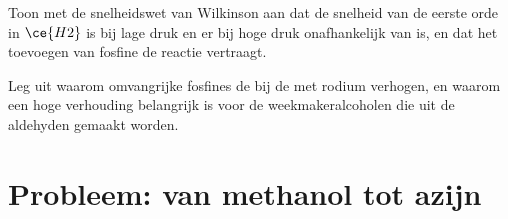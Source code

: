 \begin{exercise}[$\star\star\star$]\label{exo:b3:homogeneous-catalysis:11}
Toon met de snelheidswet van Wilkinson aan dat de snelheid van de eerste orde in $\ce{H2}$ is bij lage druk
en er bij hoge druk onafhankelijk van is, en dat het toevoegen van
fosfine de reactie vertraagt.
\end{exercise}

\begin{exercise}[$\star\star\star$]\label{exo:b3:homogeneous-catalysis:12}
Leg uit waarom omvangrijke fosfines de  bij de
 met rodium verhogen, en waarom een hoge verhouding
belangrijk is voor de weekmakeralcoholen die uit de aldehyden gemaakt
worden.
\end{exercise}

\section{Probleem: van methanol tot azijn}

